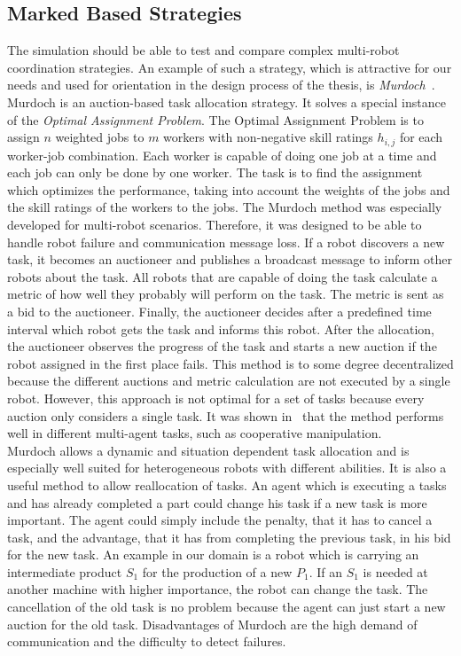 \subsection{Marked Based Strategies}
The simulation should be able to test and compare complex multi-robot coordination strategies. An example of such a strategy, which is attractive for our needs and used for orientation in the design process of the thesis, is \textit{Murdoch}~\cite{DissMurdoch}. Murdoch is an auction-based task allocation strategy. It solves a special instance of the \textit{Optimal Assignment Problem}. The Optimal Assignment Problem is to assign $n$ weighted jobs to $m$ workers with non-negative skill ratings $h_{i,j}$ for each worker-job combination. Each worker is capable of doing one job at a time and each job can only be done by one worker. The task is to find the assignment which optimizes the performance, taking into account the weights of the jobs and the skill ratings of the workers to the jobs. The Murdoch method was especially developed 
for multi-robot scenarios. Therefore, it was designed to be able to handle robot failure and communication message loss. If a robot discovers a new task, it becomes an auctioneer and publishes a broadcast message to inform other robots about the task. All robots that are capable of doing the task calculate a metric of how well they probably will perform on the task. The metric is sent as a bid to the auctioneer. Finally, the auctioneer decides after a predefined time interval which robot gets the task and informs this robot. After the allocation, the auctioneer observes the progress of the task and starts a new auction if the robot assigned in the first place fails. This method is to some degree decentralized because the different auctions and metric calculation are not executed by a single robot. However, this approach is not optimal for a set of tasks because every auction only considers a single task. It was shown in~\cite{DissMurdoch} that the method performs well in different multi-agent tasks, such as cooperative manipulation.\\
Murdoch allows a dynamic and situation dependent task allocation and is especially well suited for heterogeneous robots with different abilities. It is also a useful method to allow reallocation of tasks. An agent which is executing a tasks and has already completed a part could change his task if a new task is more important. The agent could simply include the penalty, that it has to cancel a task, and the advantage, that it has from completing the previous task, in his bid for the new task. An example in our domain is a robot which is carrying an intermediate product $S_1$ for the production of a new $P_1$. If an $S_1$ is needed at another machine with higher importance, the robot can change the task. The cancellation of the old task is no problem because the agent can just start a new auction for the old task. Disadvantages of Murdoch are the high demand of communication and the difficulty to detect failures.
